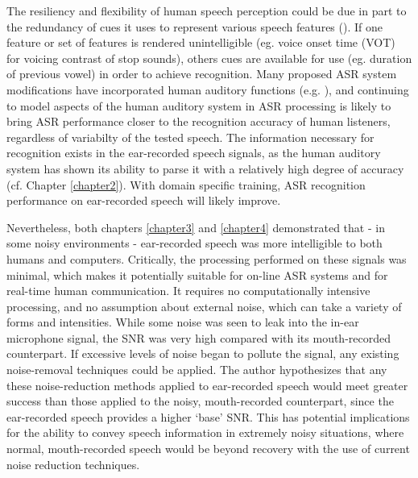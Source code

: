 The resiliency and flexibility of human speech perception could be due in part to the redundancy of cues it uses to represent various speech features (\cite{winter:14}).  If one feature or set of features is rendered unintelligible (eg. voice onset time (VOT) for voicing contrast of stop sounds), others cues are available for use (eg. duration of previous vowel) in order to achieve recognition.  Many proposed ASR system modifications have incorporated human auditory functions (e.g. \cite{kim:99,fazel:12,moritz:15}), and continuing to model aspects of the human auditory system in ASR processing is likely to bring ASR performance closer to the recognition accuracy of human listeners, regardless of variabilty of the tested speech.  The information necessary for recognition exists in the ear-recorded speech signals, as the human auditory system has shown its ability to parse it with a relatively high degree of accuracy (cf. Chapter \ref{chapter2}).  With domain specific training, ASR recognition performance on ear-recorded speech will likely improve.

Nevertheless, both chapters \ref{chapter3} and \ref{chapter4} demonstrated that - in some noisy environments - ear-recorded speech was more intelligible to both humans and computers.  Critically, the processing performed on these signals was minimal, which makes it potentially suitable for on-line ASR systems and for real-time human communication.  It requires no computationally intensive processing, and no assumption about external noise, which can take a variety of forms and intensities.  While some noise was seen to leak into the in-ear microphone signal, the SNR was very high compared with its mouth-recorded counterpart.  If excessive levels of noise began to pollute the signal, any existing noise-removal techniques could be applied.  The author hypothesizes that any these noise-reduction methods applied to ear-recorded speech would meet greater success than those applied to the noisy, mouth-recorded counterpart, since the ear-recorded speech provides a higher `base' SNR.  This has potential implications for the ability to convey speech information in extremely noisy situations, where normal, mouth-recorded speech would be beyond recovery with the use of current noise reduction techniques.

